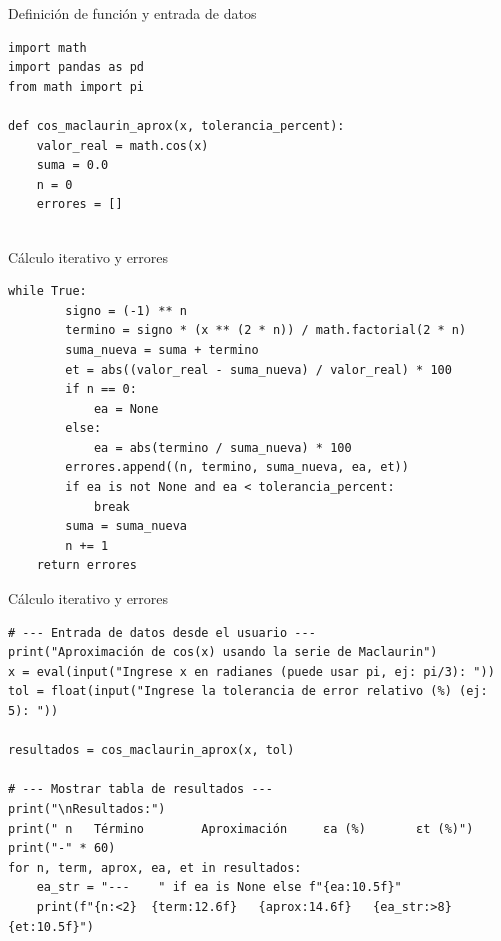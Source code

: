 \documentclass[main.tex]{subfiles}
\begin{document}
\begin{frame}[fragile]{Definición de función y entrada de datos}

\begin{lstlisting}[style=mypython]
import math
import pandas as pd
from math import pi

def cos_maclaurin_aprox(x, tolerancia_percent):
    valor_real = math.cos(x)
    suma = 0.0
    n = 0
    errores = []


\end{lstlisting}
\end{frame}

\begin{frame}[fragile]{Cálculo iterativo y errores}
\begin{lstlisting}[style=mypython]
     while True:
        signo = (-1) ** n
        termino = signo * (x ** (2 * n)) / math.factorial(2 * n)
        suma_nueva = suma + termino
        et = abs((valor_real - suma_nueva) / valor_real) * 100
        if n == 0:
            ea = None
        else:
            ea = abs(termino / suma_nueva) * 100
        errores.append((n, termino, suma_nueva, ea, et))
        if ea is not None and ea < tolerancia_percent:
            break
        suma = suma_nueva
        n += 1
    return errores
\end{lstlisting}
\end{frame}

\begin{frame}[fragile]{Cálculo iterativo y errores}
\begin{lstlisting}[style=mypython]
# --- Entrada de datos desde el usuario ---
print("Aproximación de cos(x) usando la serie de Maclaurin")
x = eval(input("Ingrese x en radianes (puede usar pi, ej: pi/3): "))
tol = float(input("Ingrese la tolerancia de error relativo (%) (ej: 5): "))

resultados = cos_maclaurin_aprox(x, tol)

# --- Mostrar tabla de resultados ---
print("\nResultados:")
print(" n   Término        Aproximación     εa (%)       εt (%)")
print("-" * 60)
for n, term, aprox, ea, et in resultados:
    ea_str = "---    " if ea is None else f"{ea:10.5f}"
    print(f"{n:<2}  {term:12.6f}   {aprox:14.6f}   {ea_str:>8}   {et:10.5f}")
\end{lstlisting}
\end{frame}
\end{document}
